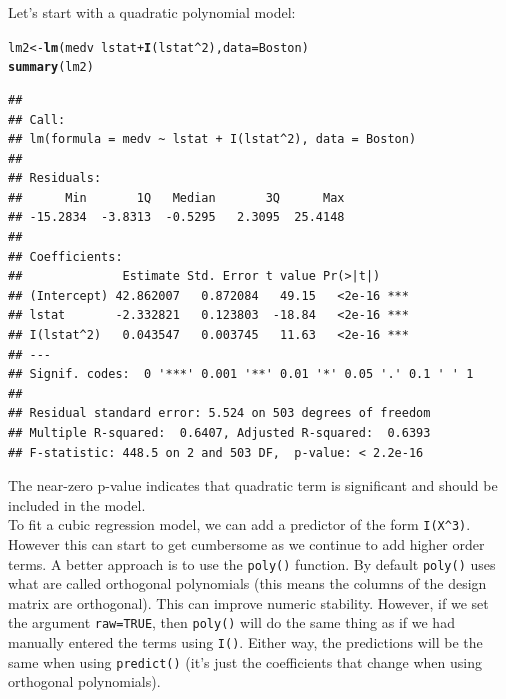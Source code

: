 \documentclass[11pt]{article}\usepackage[]{graphicx}\usepackage[]{color}
\makeatletter
\newcommand{\hlnum}[1]{\textcolor[rgb]{0.686,0.059,0.569}{#1}}%
\newcommand{\hlopt}[1]{\textcolor[rgb]{0,0,0}{#1}}%
\newcommand{\hlstd}[1]{\textcolor[rgb]{0.345,0.345,0.345}{#1}}%
\newcommand{\hlkwb}[1]{\textcolor[rgb]{0.69,0.353,0.396}{#1}}%
\newcommand{\hlkwc}[1]{\textcolor[rgb]{0.333,0.667,0.333}{#1}}%
\newcommand{\hlkwd}[1]{\textcolor[rgb]{0.737,0.353,0.396}{\textbf{#1}}}%
\newenvironment{kframe}{%
 \def\at@end@of@kframe{}%
 \ifinner\ifhmode%
  \def\at@end@of@kframe{\end{minipage}}%
  \begin{minipage}{\columnwidth}%
 \fi\fi%
 \def\FrameCommand##1{\hskip\@totalleftmargin \hskip-\fboxsep
 \colorbox{shadecolor}{##1}\hskip-\fboxsep
     \hskip-\linewidth \hskip-\@totalleftmargin \hskip\columnwidth}%
 \MakeFramed {\advance\hsize-\width
   \@totalleftmargin\z@ \linewidth\hsize
   \@setminipage}}%
 {\par\unskip\endMakeFramed%
 \at@end@of@kframe}
\newenvironment{knitrout}{}{} %
\makeatother
\begin{document}
Let's start with a quadratic polynomial model:
\begin{knitrout}
\color{fgcolor}\begin{kframe}
\begin{alltt}
\hlstd{lm2} \hlkwb{<-} \hlkwd{lm}\hlstd{(medv} \hlopt{~} \hlstd{lstat} \hlopt{+} \hlkwd{I}\hlstd{(lstat}\hlopt{^}\hlnum{2}\hlstd{),} \hlkwc{data} \hlstd{= Boston)}
\hlkwd{summary}\hlstd{(lm2)}
\end{alltt}
\begin{verbatim}
## 
## Call:
## lm(formula = medv ~ lstat + I(lstat^2), data = Boston)
## 
## Residuals:
##      Min       1Q   Median       3Q      Max 
## -15.2834  -3.8313  -0.5295   2.3095  25.4148 
## 
## Coefficients:
##              Estimate Std. Error t value Pr(>|t|)    
## (Intercept) 42.862007   0.872084   49.15   <2e-16 ***
## lstat       -2.332821   0.123803  -18.84   <2e-16 ***
## I(lstat^2)   0.043547   0.003745   11.63   <2e-16 ***
## ---
## Signif. codes:  0 '***' 0.001 '**' 0.01 '*' 0.05 '.' 0.1 ' ' 1
## 
## Residual standard error: 5.524 on 503 degrees of freedom
## Multiple R-squared:  0.6407,	Adjusted R-squared:  0.6393 
## F-statistic: 448.5 on 2 and 503 DF,  p-value: < 2.2e-16
\end{verbatim}
\end{kframe}
\end{knitrout}
The near-zero p-value indicates that quadratic term is significant and should be included in the model.\\

To fit a cubic regression model, we can add a predictor of the form \texttt{I(X\^{}3)}.  However this can start to get cumbersome as we continue to add higher order terms.  A better approach is to use the \texttt{poly()} function. By default \texttt{poly()} uses what are called orthogonal polynomials (this means the columns of the design matrix are orthogonal).  This can improve numeric stability.  However, if we set the argument \texttt{raw=TRUE}, then \texttt{poly()} will do the same thing as if we had manually entered the terms using \texttt{I()}.  Either way, the predictions will be the same when using \texttt{predict()} (it's just the coefficients that change when using orthogonal polynomials).\\
\clearpage
\end{document}
